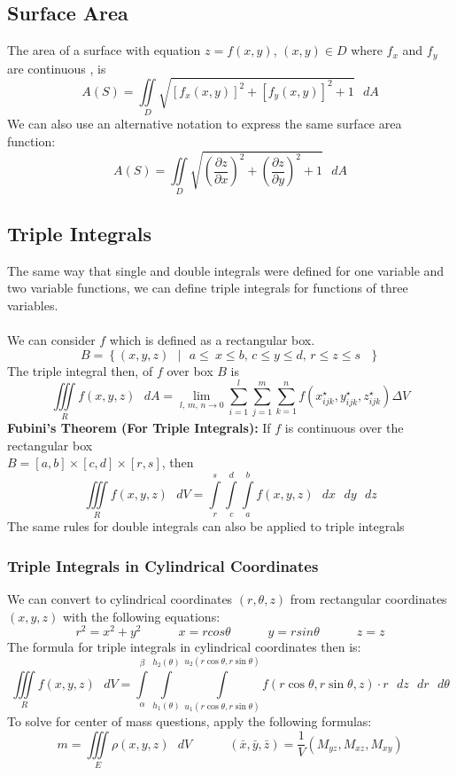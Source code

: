 \documentclass[11pt]{article}
\begin{document}
\subsection{Surface Area}
The area of a surface with equation $z = f(x,y)$, $(x,y) \in D$ where $f_x$ and $f_y$ are continuous , is 
$$ A(S) = \iint\limits_{D} \sqrt{[f_x(x,y)]^2 + [f_y(x,y)]^2+1} \text{ } dA $$
We can also use an alternative notation to express the same surface area function:
$$ A(S) = \iint\limits_{D} \sqrt{\left(\frac{\partial z}{\partial x}\right)^2 + \left(\frac{\partial z}{\partial y}\right)^2+1} \text{ } dA $$
\subsection{Triple Integrals}
The same way that single and double integrals were defined for one variable and two variable functions, we can define triple integrals for functions of three variables. \\ \\
We can consider $f$ which is defined as a rectangular box.
$$ B = \left\lbrace (x,y,z) \text{ } | \text{ } a \leq\ x \leq b \text{, } c \leq y \leq d \text{, } r \leq z \leq s \text{ }\right\rbrace$$ The triple integral then, of $f$ over box $B$ is 
$$\iiint\limits_{R} f(x,y,z)\text{ }dA = \lim_{l \text{, } m \text{, } n \to 0} \sum_{i=1}^{l} \sum_{j=1}^{m} \sum_{k=1}^{n} f(x_{ijk}^{\star}, y_{ijk}^{\star}, z_{ijk}^{\star}) \Delta V$$
\textbf{Fubini's Theorem (For Triple Integrals):} If $f$ is continuous over the rectangular box \\ $B = [a,b] \times [c,d] \times [r,s]$, then 
$$\iiint\limits_{R} f(x,y,z)\text{ }dV = \int\limits_{r}^{s} \int\limits_{c}^{d} \int\limits_{a}^{b} f(x,y,z)\text{ }dx\text{ }dy\text{ }dz $$
The same rules for double integrals can also be applied to triple integrals
\subsubsection{Triple Integrals in Cylindrical Coordinates}
We can convert to cylindrical coordinates $(r, \theta,z)$ from rectangular coordinates $(x,y,z)$ with the following equations:
$$r^2 = x^2 + y^2 \quad \quad \quad x = rcos\theta \quad \quad \quad y = rsin\theta \quad \quad \quad z=z$$
The formula for triple integrals in cylindrical coordinates then is:
$$\iiint\limits_{R} f(x,y,z)\text{ }dV = \int\limits_{\alpha}^{\beta} \int\limits_{h_1(\theta)}^{h_2(\theta)} \int\limits_{u_1(r\cos \theta, r\sin \theta)}^{u_2(r\cos \theta, r\sin \theta)} f(r\cos \theta,r \sin \theta,z)\cdot r \text{ }dz\text{ }dr\text{ }d\theta $$
To solve for center of mass questions, apply the following formulas: $$ m =\iiint\limits_{E} \rho(x,y,z)\text{ }dV \quad \quad \quad (\bar{x}, \bar{y}, \bar{z}) = \frac{1}{V}(M_{yz}, M_{xz}, M_{xy})$$
\end{document}
